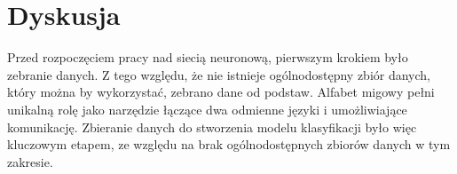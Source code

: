 \hypersetup{pageanchor=true}

\chapter{Dyskusja}\label{ch:discussion}

Przed rozpoczęciem pracy nad siecią neuronową, pierwszym krokiem było zebranie danych. Z tego względu, że nie istnieje ogólnodostępny zbiór danych, który można by wykorzystać, zebrano dane od podstaw. Alfabet migowy pełni unikalną rolę jako narzędzie łączące dwa odmienne języki i umożliwiające komunikację. Zbieranie danych do stworzenia modelu klasyfikacji było więc kluczowym etapem, ze względu na brak ogólnodostępnych zbiorów danych w tym zakresie.



